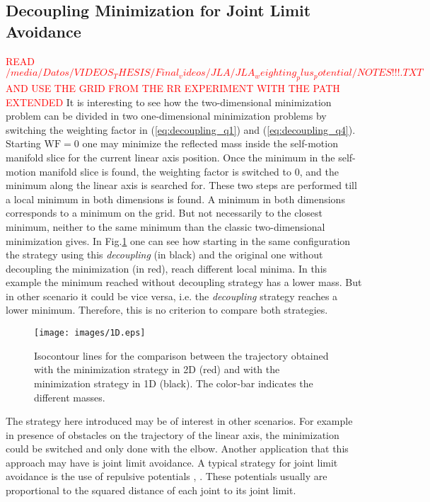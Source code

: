 \subsection{Decoupling Minimization for Joint Limit Avoidance}
\label{subsec:wf_JLA}

\textcolor{red}{READ $/media/Datos/VIDEOS_THESIS/Final_videos/JLA/JLA_weighting_plus_potential/NOTES!!!.TXT$ AND USE THE GRID FROM THE RR EXPERIMENT WITH THE PATH EXTENDED}
It is interesting to see how the two-dimensional minimization problem can be divided in two one-dimensional minimization problems by switching the weighting factor in (\ref{eq:decoupling_q1}) and (\ref{eq:decoupling_q4}). Starting  $\mathrm{WF  = 0}$  one may minimize the reflected mass inside the self-motion manifold slice for the current linear axis position. Once the minimum in the self-motion manifold slice is found, the weighting factor is switched to $0$, and the minimum along the linear axis is searched for. These two steps are performed till a local minimum in both dimensions is found. 
A minimum in both dimensions corresponds to a minimum on the grid. But not necessarily to the closest minimum, neither to the same minimum than the classic two-dimensional minimization gives. In  Fig.\ref{fig:1D} one can see how starting in the same configuration the strategy using this \textit{decoupling} (in black) and the original one without decoupling the minimization (in red), reach different local minima. In this example the minimum reached without decoupling strategy has a lower mass. But in other scenario it could be vice versa, i.e. the \textit{decoupling}  strategy reaches a lower minimum. 	Therefore, this is no criterion to compare both strategies.
%
\begin{figure}[!htb]
	\centerline{
		\texttt{[image: images/1D.eps]}}
	\caption{Isocontour lines for the comparison between the trajectory obtained with the minimization strategy in 2D (red) and with the minimization strategy in 1D (black). The color-bar indicates the different masses.}
	\label{fig:1D}
\end{figure} 
%
The strategy here introduced may be of interest in other scenarios. For example in presence of obstacles on the trajectory of the linear axis, the minimization could be switched and only done with the elbow.
Another application that this approach may have is joint limit avoidance.
A typical strategy for joint limit avoidance is the use of repulsive potentials \cite{JLA_3}, \cite{JLA_4}. These potentials usually are proportional to the squared distance of each joint to its joint limit. 

